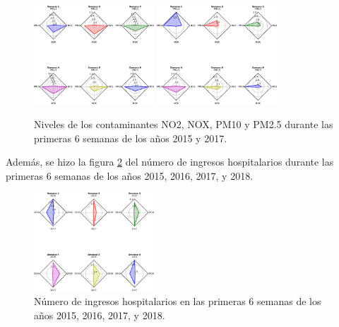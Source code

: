 \documentclass[a0]{sciposter} %
\begin{document}
\begin{multicols}{2}
\begin{figure}
\setcounter{figure}{0} %
\captionsetup{type=figure} %
\begin{center}
   \includegraphics[width=0.4\textwidth]{Contaminantes-2015.eps}
   \hspace{2cm}
   \includegraphics[width=0.4\textwidth]{Contaminantes-2017.eps}
   \end{center}
    \caption{Niveles de los contaminantes NO2, NOX, PM10 y PM2.5 durante las primeras 6 semanas de los años 2015 y 2017.}
    \label{contaminantes}
\end{figure}

Además, se hizo la figura \ref{ingresos} del número de ingresos hospitalarios durante las primeras 6 semanas de los años 2015, 2016, 2017, y 2018.

\begin{figure}
\setcounter{figure}{1} %
\captionsetup{type=figure} %
\begin{center}
   \includegraphics[width=0.4\textwidth]{Ingresos-hospitalarios.eps}
   \end{center}
    \caption{Número de ingresos hospitalarios en las primeras 6 semanas de los años 2015, 2016, 2017, y 2018.}
    \label{ingresos}
\end{figure}



\end{multicols}
\end{document}
